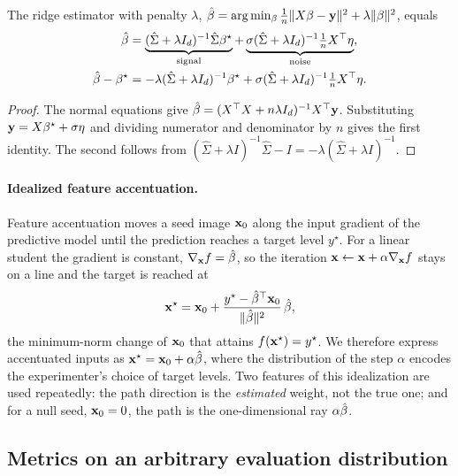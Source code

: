 \begin{lem}
\label{lem:app-ridge-decomposition}
The ridge estimator with penalty $\lambda$,
$\hat{\beta}=\arg\min_\beta\frac1n\|X\beta-\mathbf y\|^2+\lambda\|\beta\|^2$, equals
\begin{equation}
\begin{aligned}
\hat{\beta}&=\underbrace{(\hat\Sigma+\lambda I_d)^{-1}\hat\Sigma{\beta^{\star}}}_{\text{signal}}
+\underbrace{\sigma(\hat\Sigma+\lambda I_d)^{-1}\tfrac1nX^\top\eta}_{\text{noise}},\\
\hat{\beta}-{\beta^{\star}}&=-\lambda(\hat\Sigma+\lambda I_d)^{-1}{\beta^{\star}}
+\sigma(\hat\Sigma+\lambda I_d)^{-1}\tfrac1nX^\top\eta .
\end{aligned}
\label{eq:app-ridge-decomposition}
\end{equation}
\end{lem}
\begin{proof}
The normal equations give $\hat{\beta}=(X^\top X+n\lambda I_d)^{-1}X^\top\mathbf y$.
Substituting $\mathbf y=X{\beta^{\star}}+\sigma\eta$ and dividing numerator and
denominator by $n$ gives the first identity.  The second follows from
$(\hat\Sigma+\lambda I)^{-1}\hat\Sigma-I=-\lambda(\hat\Sigma+\lambda I)^{-1}$.
\end{proof}

\paragraph{Idealized feature accentuation.}
Feature accentuation moves a seed image $\mathbf{x}_0$ along the input gradient of
the predictive model until the prediction reaches a target level $y^\star$.
For a linear student the gradient is constant, $\nabla_{\mathbf{x}} f=\hat{\beta}$, so the
iteration $\mathbf{x}\gets\mathbf{x}+\alpha\nabla_{\mathbf{x}} f$ stays on a line and the target is
reached at
\begin{equation}
\mathbf{x}^\star=\mathbf{x}_0+\frac{y^\star-{\hat{\beta}}^\top\mathbf{x}_0}{\|\hat{\beta}\|^2}\,\hat{\beta} ,
\label{eq:app-accentuation-closed-form}
\end{equation}
the minimum-norm change of $\mathbf{x}_0$ that attains $f(\mathbf{x}^\star)=y^\star$.
We therefore express accentuated inputs as $\mathbf{x}^\star=\mathbf{x}_0+\alpha\hat{\beta}$, where
the distribution of the step $\alpha$ encodes the experimenter's choice of
target levels.  Two features of this idealization are used repeatedly:
the path direction is the \emph{estimated} weight, not the true one; and for
a null seed, $\mathbf{x}_0=0$, the path is the one-dimensional ray $\alpha\hat{\beta}$.

\subsection{Metrics on an arbitrary evaluation distribution}

